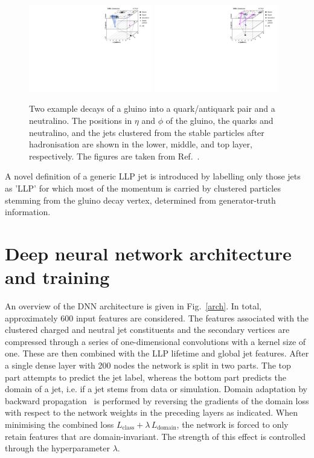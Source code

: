 \documentclass{webofc}
\begin{document}
\begin{figure}[!ht]
\includegraphics[width=0.48\textwidth]{figs/decay1.pdf}\hspace{0.03\textwidth}
\includegraphics[width=0.48\textwidth]{figs/decay2.pdf}
\centering
\caption{Two example decays of a gluino into a quark/antiquark pair and a neutralino. The positions in $\eta$ and $\phi$ of the gluino, the quarks and neutralino, and the jets clustered from the stable particles after hadronisation are shown in the lower, middle, and top layer, respectively. The figures are taken from Ref.~\cite{CMS-EXO-19-011}.}
\label{decay}
\end{figure}

A novel definition of a generic LLP jet is introduced by labelling only those jets as 'LLP' for which most of the momentum is carried by clustered particles stemming from the gluino decay vertex, determined from generator-truth information.


\section{Deep neural network architecture and training}
\label{dnn}

An overview of the DNN architecture is given in Fig.~\ref{arch}. In total, approximately 600 input features are considered. The features associated with the clustered charged and neutral jet constituents and the secondary vertices are compressed through a series of one-dimensional convolutions with a kernel size of one. These are then combined with the LLP lifetime and global jet features. After a single dense layer with 200 nodes the network is split in two parts. The top part attempts to predict the jet label, whereas the bottom part predicts the domain of a jet, i.e. if a jet stems from data or simulation. Domain adaptation by backward propagation~\cite{da} is performed by reversing the gradients of the domain loss with respect to the network weights in the preceding layers as indicated. When minimising the combined loss $L_\mathrm{class}+\lambda\,L_\mathrm{domain}$, the network is forced to only retain features that are domain-invariant. The strength of this effect is controlled through the hyperparameter $\lambda$.
\end{document}

